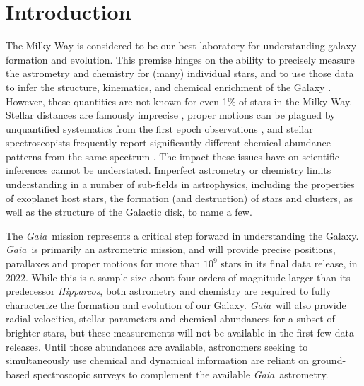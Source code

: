 \documentclass[preprint,trackchanges]{aastex}
\newcommand{\project}[1]{\textsl{#1}}
\newcommand{\gaia}{\project{Gaia}}
\newcommand{\hipparcos}{\project{Hipparcos}}
\begin{document}
\keywords{\vspace{5em}}



\section{Introduction} 
\label{sec:introduction}

The Milky Way is considered to be our best laboratory for understanding galaxy
formation and evolution.  This premise hinges on the ability to precisely measure 
the astrometry and chemistry for (many) individual stars, and to use those data 
to infer the structure, kinematics, and chemical enrichment of the Galaxy 
\citep[e.g.,][]{Schlaufman_2009,Deason_2011,Ness_2012,Ness_2013a,Ness_2013b,
Casey_2012,Casey_2013,Casey_2014a,Casey_2014b,Kordopatis_2015,Bovy_2016}.  
However, these quantities are not known for even 1\% of stars in the Milky Way.  
Stellar distances are famously imprecise \citep[e.g.,][]{van_Leeuwen_2007,
Jofre_2015,Madler_2016}, proper motions can be plagued by unquantified systematics 
from the first epoch observations \citep[e.g.,][]{Casey_Schlaufman_2015}, and 
stellar spectroscopists frequently report significantly different chemical 
abundance patterns from the same spectrum \citep{Smiljanic_2014}.  The impact 
these issues have on scientific inferences cannot be understated.  Imperfect 
astrometry or chemistry limits understanding in a number of sub-fields in
astrophysics, including the properties of exoplanet host stars, the formation 
(and destruction) of stars and clusters, as well as the structure of the 
Galactic disk, to name a few.


The \gaia\ mission represents a critical step forward in understanding the Galaxy.
\gaia\ is primarily an astrometric mission, and will provide precise positions,
parallaxes and proper motions for more than $10^9$ stars in its final data
release, in 2022.  While this is a sample size about four orders of magnitude 
larger than its predecessor \hipparcos, both astrometry and chemistry are 
required to fully characterize the formation and evolution of our Galaxy. 
\gaia\ will also provide radial velocities, stellar parameters and chemical 
abundances for a subset of brighter stars, but these measurements will not be 
available in the first few data releases. Until those abundances are available,
astronomers seeking to simultaneously use chemical and dynamical information are
reliant on ground-based spectroscopic surveys to complement the available 
\gaia\ astrometry.
\end{document}
